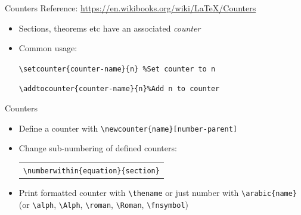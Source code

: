 \documentclass[11pt]{beamer}
\newcommand{\bs}{\textbackslash}
\begin{document}
\begin{frame}{Counters}
  Reference: \url{https://en.wikibooks.org/wiki/LaTeX/Counters}

  \vspace{0.5cm}
  \begin{itemize}
    \item Sections, theorems etc have an associated \emph{counter}

    \vspace{0.2cm}
    \item Common usage:

          \vspace{0.1cm}
          \texttt{\bs setcounter\{counter-name\}\{n\} \quad \%Set counter to n}

          \vspace{0.1cm}
          \texttt{\bs addtocounter\{counter-name\}\{n\}\quad\%Add n to counter}
  \end{itemize}
\end{frame}


\begin{frame}{Counters}
  
  \begin{itemize}
    \item Define a counter with \texttt{\bs newcounter\{name\}[number-parent]}

    \vspace{0.2cm}
    \item Change sub-numbering of defined counters:

          \vspace{0.15cm}
          \begin{center}
            \begin{tabular}{l}
              \texttt{\bs numberwithin\{equation\}\{section\}}
            \end{tabular}
          \end{center}

    \vspace{0.2cm}
    \item Print formatted counter with \texttt{\bs{\color{red}the}name}
          or just number with \texttt{\bs arabic\{name\}}
          (or \texttt{\bs alph}, \texttt{\bs Alph}, \texttt{\bs roman}, 
          \texttt{\bs Roman}, \texttt{\bs fnsymbol})
  \end{itemize}
\end{frame}
\end{document}
